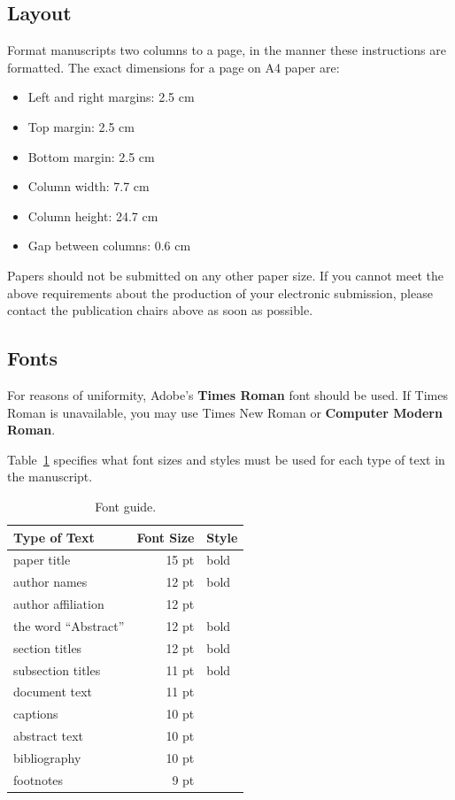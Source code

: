 \documentclass[11pt,a4paper]{article}
\begin{document}
\subsection{Layout}
\label{ssec:layout}

Format manuscripts two columns to a page, in the manner these
instructions are formatted.
The exact dimensions for a page on A4 paper are:

\begin{itemize}
\item Left and right margins: 2.5 cm
\item Top margin: 2.5 cm
\item Bottom margin: 2.5 cm
\item Column width: 7.7 cm
\item Column height: 24.7 cm
\item Gap between columns: 0.6 cm
\end{itemize}

\noindent Papers should not be submitted on any other paper size.
If you cannot meet the above requirements about the production of your electronic submission, please contact the publication chairs above as soon as possible.

\subsection{Fonts}

For reasons of uniformity, Adobe's \textbf{Times Roman} font should be used.
If Times Roman is unavailable, you may use Times New Roman or \textbf{Computer Modern Roman}.

Table~\ref{font-table} specifies what font sizes and styles must be used for each type of text in the manuscript.

\begin{table}
\centering
\begin{tabular}{lrl}
\hline \textbf{Type of Text} & \textbf{Font Size} & \textbf{Style} \\ \hline
paper title & 15 pt & bold \\
author names & 12 pt & bold \\
author affiliation & 12 pt & \\
the word ``Abstract'' & 12 pt & bold \\
section titles & 12 pt & bold \\
subsection titles & 11 pt & bold \\
document text & 11 pt  &\\
captions & 10 pt & \\
abstract text & 10 pt & \\
bibliography & 10 pt & \\
footnotes & 9 pt & \\
\hline
\end{tabular}
\caption{\label{font-table} Font guide. }
\end{table}
\end{document}
